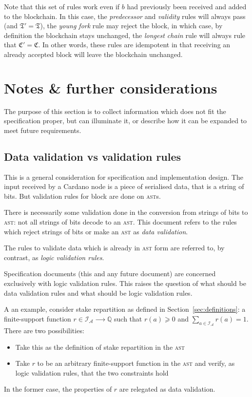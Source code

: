 \documentclass{article}
\newcommand{\idsof}[1]{\mathcal{I}\!_#1}
\newcommand{\agentids}{\idsof{\mathcal{A}}}
\begin{document}
Note that this set of rules work even if $b$ had previously been
received and added to the blockchain. In this case, the
\emph{predecessor} and \emph{validity} rules will always pass (and
$\mathfrak{T}'=\mathfrak{T}$), the \emph{young fork} rule may reject
the block, in which case, by definition the blockchain stays
unchanged, the \emph{longest chain} rule will always rule that
$\mathfrak{C'}=\mathfrak{C}$. In other words, these rules are
idempotent in that receiving an already accepted block will leave the
blockchain unchanged.

\appendix

\section{Notes \& further considerations}
\label{sec:notes}

The purpose of this section is to collect information which does not
fit the specification proper, but can illuminate it, or describe how
it can be expanded to meet future requirements.

\subsection{Data validation vs validation rules}
\label{sec:data-validation-vs}

This is a general consideration for specification and implementation
design. The input received by a Cardano node is a piece of serialised
data, that is a string of bits. But validation rules for block are
done on \textsc{ast}s.

There is necessarily some validation done in the conversion from
strings of bits to \textsc{ast}: not all strings of bits decode to an
\textsc{ast}. This document refers to the rules which reject strings
of bits or make an \textsc{ast} as \emph{data validation}.

The rules to validate data which is already in \textsc{ast} form are
referred to, by contrast, as \emph{logic validation rules}.

Specification documents (this and any future document) are concerned
exclusively with logic validation rules. This raises the
question of what should be data validation rules and what should be
logic validation rules.

A an example, consider stake repartition as defined in
Section~\ref{sec:definitions}: a finite-support function $r∈\agentids
⟶ \mathbb{Q}$ such that $r(a) ⩾ 0$ and $∑_{a∈\agentids} r(a) =
1$. There are two possibilities:
\begin{itemize}
\item Take this as the definition of stake repartition in the
  \textsc{ast}
\item Take $r$ to be an arbitrary finite-support function in the
  \textsc{ast} and verify, as logic validation rules, that the two
  constraints hold
\end{itemize}
In the former case, the properties of $r$ are relegated as data
validation.
\end{document}
